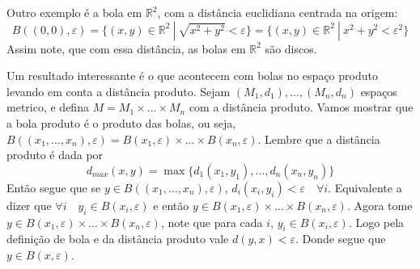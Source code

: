 \documentclass{article}
\begin{document}
Outro exemplo é a bola em $\mathbb{R}^2$, com a distância euclidiana centrada na origem:
\[B((0, 0), \varepsilon) = \{ (x,y) \in \mathbb{R}^2 \: | \: \sqrt{x^2 + y^2} < \varepsilon\} = \{ (x,y) \in \mathbb{R}^2 \: | \: x^2 + y^2 < \varepsilon^2\}\]
Assim note, que com essa distância, as bolas em $\mathbb{R}^2$ são discos.

Um resultado interessante é o que acontecem com bolas no espaço produto levando em conta a distância produto.
Sejam $(M_1, d_1), \dots ,(M_n, d_n)$ espaços metrico, e defina $M = M_1 \times \dots \times M_n $ com a distância produto.
Vamos mostrar que a bola produto é o produto das bolas, ou seja, $B((x_1, \dots, x_n), \varepsilon) = B(x_1, \varepsilon) \times \dots \times B(x_n, \varepsilon)$.
Lembre que a distância produto é dada por 
\[d_{max}(x, y) = \max\{d_1(x_1, y_1), \dots, d_n(x_n, y_n)\}\]
Então segue que se $y \in B((x_1, \dots, x_n), \varepsilon)$, $d_i(x_i, y_i) < \varepsilon \quad \forall i$.
Equivalente a dizer que $\forall i \quad y_i \in B(x_i, \varepsilon)$ e então $y \in  B(x_1, \varepsilon) \times \dots \times  B(x_n, \varepsilon)$.
Agora tome $y \in  B(x_1, \varepsilon) \times \dots \times  B(x_n, \varepsilon)$, note que para cada $i$, $y_i \in B(x_i, \varepsilon)$.
Logo pela definição de bola e da distância produto vale $d(y, x) < \varepsilon$. Donde segue que $y \in B(x, \varepsilon)$.
\end{document}
